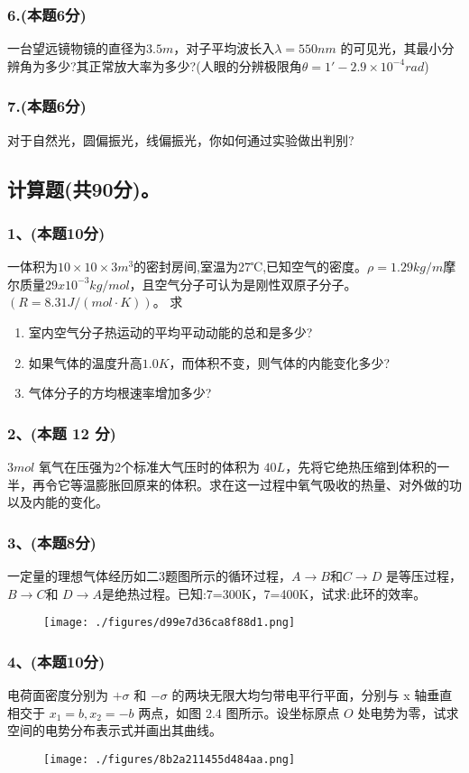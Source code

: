 \subsubsection{6.(本题6分)}
一台望远镜物镜的直径为$3.5m$，对子平均波长入$\lambda=550nm$ 的可见光，其最小分辨角为多少?其正常放大率为多少?(人眼的分辨极限角$\theta=1'-2.9\times10^{-4}rad$)
\subsubsection{7.(本题6分)}
对于自然光，圆偏振光，线偏振光，你如何通过实验做出判别?
\subsection{计算题(共90分)。}
\subsubsection{1、(本题10分)}
一体积为$10\times10\times3m^3$的密封房间,室温为27℃,已知空气的密度。$\rho=1.29kg/m$摩尔质量$29x10^{-3}kg/mol$，且空气分子可认为是刚性双原子分子。$(R=8.31J/(mol\cdot K))$。
求
\begin{enumerate}
\item 室内空气分子热运动的平均平动动能的总和是多少?
\item 如果气体的温度升高$1.0K$，而体积不变，则气体的内能变化多少?
\item 气体分子的方均根速率增加多少?
\end{enumerate}
\subsubsection{2、(本题 12 分)}
$3mol$ 氧气在压强为2个标准大气压时的体积为 $40L$，先将它绝热压缩到体积的一半，再令它等温膨胀回原来的体积。求在这一过程中氧气吸收的热量、对外做的功以及内能的变化。
\subsubsection{3、(本题8分)}
一定量的理想气体经历如二3题图所示的循环过程，$A\to B$和$C\to D$ 是等压过程，$B\to C$和 $D\to A$是绝热过程。已知:7=300K，7=400K，试求:此环的效率。
\begin{figure}[ht]
\centering
\texttt{[image: ./figures/d99e7d36ca8f88d1.png]}
\caption{} \label{fig_CD13_3}
\end{figure}
\subsubsection{4、(本题10分)}
电荷面密度分别为 $+\sigma$ 和 $-\sigma$ 的两块无限大均匀带电平行平面，分别与 x 轴垂直相交于 $x_1 = b, x_2 = -b$ 两点，如图 2.4 图所示。设坐标原点 $O$ 处电势为零，试求空间的电势分布表示式并画出其曲线。
\begin{figure}[ht]
\centering
\texttt{[image: ./figures/8b2a211455d484aa.png]}
\caption{} \label{fig_CD13_4}
\end{figure}
